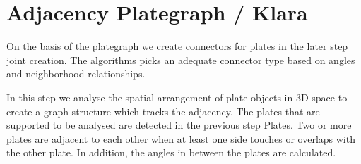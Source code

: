 \documentclass[../ClassicThesis.tex]{subfiles}
\begin{document}
\chapter{Adjacency Plategraph / Klara}\label{ch:graph}
\newcommand{\TODO}[1]{\textcolor{red}{\\ \textbf{TODO:} #1 \\}}





On the basis of the plategraph we create connectors for plates in the later step \hyperref[ch:joints]{joint creation}. The algorithms picks an adequate connector type based on angles and neighborhood relationships.

In this step we analyse the spatial arrangement of plate objects in 3D space to create a graph structure which tracks the adjacency. The plates that are supported to be analysed are detected in the previous step \hyperref[ch:plates]{Plates}. Two or more plates are adjacent to each other when at least one side touches or overlaps with the other plate. In addition, the angles in between the plates are calculated.
\end{document}
